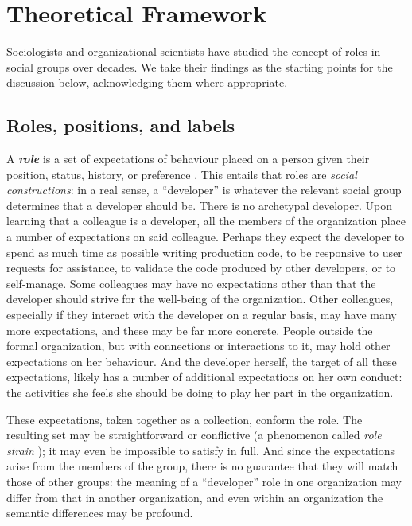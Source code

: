 \documentclass[10pt, conference, compsocconf]{IEEEtran}
\begin{document}
\section{Theoretical Framework}

Sociologists and organizational scientists have studied the concept of roles in social groups over decades. We take their findings as the starting points for the discussion below, acknowledging them where appropriate.

\subsection{Roles, positions, and labels}

A \textbf{\emph{role}} is a set of expectations of behaviour placed on a person given their position, status, history, or preference \cite{Turner1956,Gordon1976,Rizzo1970}. This entails that roles are \emph{social constructions}: in a real sense, a ``developer'' is whatever the relevant social group determines that a developer should be. There is no archetypal developer. Upon learning that a colleague is a developer, all the members of the organization place a number of expectations on said colleague. Perhaps they expect the developer to spend as much time as possible writing production code, to be responsive to user requests for assistance, to validate the code produced by other developers, or to self-manage. Some colleagues may have no expectations other than that the developer should strive for the well-being of the organization. Other colleagues, especially if they interact with the developer on a regular basis, may have many more expectations, and these may be far more concrete. People outside the formal organization, but with connections or interactions to it, may hold other expectations on her behaviour. And the developer herself, the target of all these expectations, likely has a number of additional expectations on her own conduct: the activities she feels she should be doing to play her part in the organization.

These expectations, taken together as a collection, conform the role. The resulting set may be straightforward or conflictive (a phenomenon called \emph{role strain} \cite{Goode1960}); it may even be impossible to satisfy in full. And since the expectations arise from the members of the group, there is no guarantee that they will match those of other groups: the meaning of a ``developer'' role in one organization may differ from that in another organization, and even within an organization the semantic differences may be profound.
\end{document}
